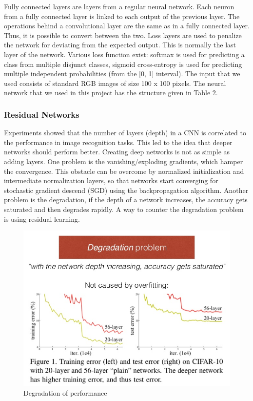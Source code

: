 \documentclass[a4paper,11pt]{article}
\begin{document}
	Fully connected layers are layers from a regular neural network. Each neuron from
	a fully connected layer is linked to each output of the previous layer. The
	operations behind a convolutional layer are the same as in a fully connected
	layer. Thus, it is possible to convert between the two.
	Loss layers are used to penalize the network for deviating from the
	expected output. This is normally the last layer of the network. Various loss
	function exist: softmax is used for predicting a class from multiple disjunct
	classes, sigmoid cross-entropy is used for predicting multiple independent
	probabilities (from the [0, 1] interval). The input that we used consists of
	standard RGB images of size 100 x 100 pixels. The neural network that we
	used in this project has the structure given in Table 2.
	
	\subsubsection{Residual Networks}
	Experiments showed that the number of layers (depth) in a CNN is correlated to the performance in image recognition tasks. This led to the idea that deeper networks should perform better. Creating deep networks is not as simple as adding layers. One problem is the vanishing/exploding gradients, which hamper the convergence. This obstacle can be overcome by normalized initialization and intermediate normalization layers, so that networks start converging for stochastic gradient descend (SGD) using the backpropagation algorithm. Another problem is the degradation, if the depth of a network increases, the accuracy gets saturated and then degrades rapidly. A way to counter the degradation problem is using residual learning.\cite{resnet}
	\begin{figure}[H]
		\includegraphics[width = \textwidth]{degradation.jpg}
		\caption{Degradation of performance}
	\end{figure}
	 
\end{document}
